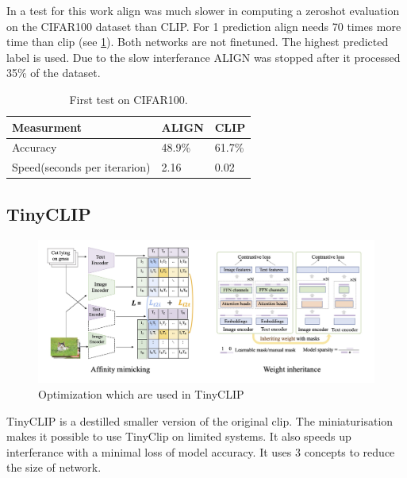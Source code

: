        In a test for this work \acrshort{align} was much slower in computing a zeroshot evaluation on the CIFAR100\cite{cifar100} dataset than CLIP.
        For 1 prediction \acrshort{align} needs 70 times more time than \acrshort{clip} (see \cref{tab:clipaligntest}).
        Both networks are not finetuned. The highest predicted label is used. Due to the slow interferance ALIGN was stopped after it processed 35\% of the dataset.

        \begin{table}
            \centering
            \begin{tabular}{lll}
                \hline
            \textbf{Measurment}&\textbf{ALIGN}&\textbf{CLIP}\\\hline
            Accuracy& 48.9\% & 61.7\%\\
            Speed(seconds per iterarion)&  2.16&  0.02\\ \hline
            \end{tabular}
            \caption{First test on CIFAR100.}
            \label{tab:clipaligntest}
        \end{table}

        \subsection{TinyCLIP
            \label{section:tinyclip}}
        \begin{figure}
            \centering
            \includegraphics[width=\textwidth]{Images/crossmodalnetworks/TinyCLIP.jpg}
            \caption{Optimization which are used in TinyCLIP\cite{tinyclip}}
            \label{fig:crossmodalnetworks:tinyclip}
        \end{figure}

        TinyCLIP\cite{tinyclip} is a destilled smaller version of the original \acrshort{clip}.
        The miniaturisation makes it possible to use TinyClip on limited systems.
        It also speeds up interferance with a minimal loss of model accuracy.
        It uses 3 concepts to reduce the size of network.

